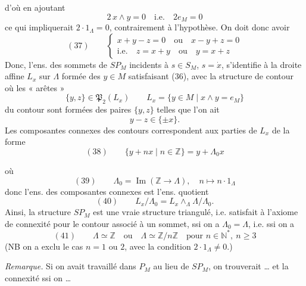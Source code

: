 \documentclass[11pt,a4paper]{article}
\begin{document}
d'où en ajoutant
\[
2\, x \wedge y = 0 \quad \text{i.e.} \quad 2 e_M = 0
\]
ce qui impliquerait $2 \cdot 1_\Lambda = 0$, contrairement à l'hypothèse. On doit donc avoir
\[
(37)\qquad \begin{cases} x + y - z = 0 \quad \text{ou} \quad x - y + z = 0 \\ \text{i.e.} \quad z = x + y \quad \text{ou} \quad y = x + z \end{cases}
\]
Donc, l'ens. des sommets de $SP_M$ incidents à $s \in S_M$, $s = \dot{x}$, s'identifie à la droite affine $L_x$ sur $\Lambda$ formée des $y \in M$ satisfaisant (36), avec la structure de contour où les « arêtes »
\[
\{y,z\} \in \mathfrak{P}_2(L_x) \qquad L_x = \{ y \in M \mid x \wedge y = e_M \}
\]
 du contour sont formées des paires $\{y,z\}$ telles que l'on ait
\[
y - z \in \{\pm x\} .
\]
Les composantes connexes des contours correspondent  aux \struck{\ill{}}  parties de $L_x$ de la forme
\[
(38)\qquad \{ y + n x \mid n \in \mathbb{Z} \} = y + \Lambda_0 x
\]

où
\[
(39)\qquad \Lambda_0 = \operatorname{Im}(\mathbb{Z} \to \Lambda), \quad n \mapsto n \cdot 1_\Lambda
\]
donc l'ens. des composantes connexes est l'ens.  quotient
\[
(40)\qquad L_x/\Lambda_0 = L_x \wedge_\Lambda \Lambda/\Lambda_0 .
\]
Ainsi, la structure $SP_M$ est une vraie structure  triangulé, \struck{\ill{}} i.e. satisfait à l'axiome de connexité pour le contour associé à un sommet, ssi on a $\Lambda_0 = \Lambda$, i.e. ssi on a
\[
(41)\qquad \Lambda \simeq \mathbb{Z} \quad \text{ou} \quad \Lambda \simeq \mathbb{Z}/n\mathbb{Z} \quad \text{pour } n \in \mathbb{N}^*,\ n \geq 3
\]
(NB on a exclu le cas $n = 1$ ou $2$, avec la condition $2 \cdot 1_\Lambda \neq 0$.)

\emph{Remarque.} Si on avait travaillé dans $P_M$ au lieu de $SP_M$, on trouverait     … et la connexité ssi on … \ill{}

\end{document}
